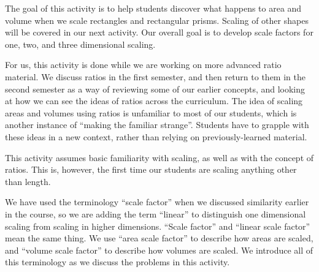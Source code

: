 \documentclass[nooutcomes]{ximera}
\begin{document}
\newpage
\begin{instructorNotes}
The goal of this activity is to help students discover what happens to area and volume when we scale rectangles and rectangular prisms.  Scaling of other shapes will be covered in our next activity.  Our overall goal is to develop scale factors for one, two, and three dimensional scaling. 

For us, this activity is done while we are working on more advanced ratio material.  We discuss ratios in the first semester, and then return to them in the second semester as a way of reviewing some of our earlier concepts, and looking at how we can see the ideas of ratios across the curriculum.  The idea of scaling areas and volumes using ratios is unfamiliar to most of our students, which is another instance of ``making the familiar strange''.  Students have to grapple with these ideas in a new context, rather than relying on previously-learned material.

This activity assumes basic familiarity with scaling, as well as with the concept of ratios.  This is, however, the first time our students are scaling anything other than length.

We have used the terminology ``scale factor'' when we discussed similarity earlier in the course, so we are adding the term ``linear'' to distinguish one dimensional scaling from scaling in higher dimensions.  ``Scale factor'' and ``linear scale factor'' mean the same thing.  We use ``area scale factor'' to describe how areas are scaled, and ``volume scale factor'' to describe how volumes are scaled.  We introduce all of this terminology as we discuss the problems in this activity.


\end{instructorNotes}
\end{document}
